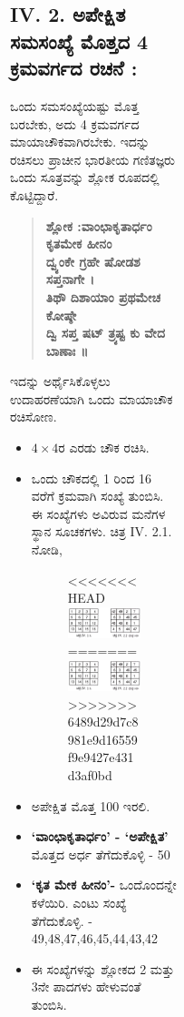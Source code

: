 \begin{figure}[H]
\begin{figure}[H]
\begin{figure}[h]
\begin{figure}[h]
\subsection*{IV. 2. ಅಪೇಕ್ಷಿತ ಸಮಸಂಖ್ಯೆ ಮೊತ್ತದ 4 ಕ್ರಮವರ್ಗದ ರಚನೆ :}

ಒಂದು ಸಮಸಂಖ್ಯೆಯಷ್ಟು ಮೊತ್ತ ಬರಬೇಕು, ಅದು 4 ಕ್ರಮವರ್ಗದ ಮಾಯಾಚೌಕವಾಗಿರಬೇಕು. ಇದನ್ನು ರಚಿಸಲು ಪ್ರಾಚೀನ ಭಾರತೀಯ ಗಣಿತಜ್ಞರು ಒಂದು ಸೂತ್ರವನ್ನು ಶ್ಲೋಕ ರೂಪದಲ್ಲಿ ಕೊಟ್ಟಿದ್ದಾರೆ.
\begin{quote}
\textbf{ಶ್ಲೋಕ :ವಾಂಛಾಕೃತಾರ್ಧಂ ಕೃತಮೇಕ ಹೀನಂ}\\
\textbf{ದ್ವ್ಯಂಕೇ ಗ್ರಹೇ ಷೋಡಶ ಸಪ್ತನಾಗೇ ।}\\
\textbf{ತಿಥೌ ದಿಶಾಯಾಂ ಪ್ರಥಮೇಚ ಕೋಷ್ಠೇ}\\
\textbf{ದ್ವಿ ಸಪ್ತ ಷಟ್ ತ್ರ್ಯಷ್ಟ ಕು ವೇದ ಬಾಣಾಃ ॥}
\end{quote}

ಇದನ್ನು ಅರ್ಥೈಸಿಕೊಳ್ಳಲು ಉದಾಹರಣೆಯಾಗಿ ಒಂದು ಮಾಯಾಚೌಕ ರಚಿಸೋಣ.
\begin{itemize}
	\item $4 \times 4$ರ ಎರಡು ಚೌಕ ರಚಿಸಿ.
	\item ಒಂದು ಚೌಕದಲ್ಲಿ 1 ರಿಂದ 16 ವರೆಗೆ ಕ್ರಮವಾಗಿ ಸಂಖ್ಯೆ ತುಂಬಿಸಿ. ಈ ಸಂಖ್ಯೆಗಳು ಅವಿರುವ ಮನೆಗಳ ಸ್ಥಾನ ಸೂಚಕಗಳು. ಚಿತ್ರ IV. 2.1. ನೋಡಿ,
	\begin{figure}[h]
<<<<<<< HEAD
	\includegraphics{src/figures/chap3/fig3-40.jpg}
=======
	\includegraphics[scale=.9]{src/figures/chap3/fig3.40.jpg}
>>>>>>> 6489d29d7c8981e9d16559f9e9427e431d3af0bd
	\end{figure}
	\item ಅಪೇಕ್ಷಿತ ಮೊತ್ತ 100 ಇರಲಿ.
	\item \textbf{‘ವಾಂಛಾಕೃತಾರ್ಧಂ’ - ‘ಅಪೇಕ್ಷಿತ’} ಮೊತ್ತದ ಅರ್ಧ ತೆಗೆದುಕೊಳ್ಳಿ - 50
	\item \textbf{‘ಕೃತ ಮೇಕ ಹೀನಂ’-} ಒಂದೊಂದನ್ನೇ ಕಳೆಯಿರಿ. ಎಂಟು ಸಂಖ್ಯೆ ತೆಗೆದುಕೊಳ್ಳಿ. - 49,48,47,46,45,44,43,42
	\item ಈ ಸಂಖ್ಯೆಗಳನ್ನು ಶ್ಲೋಕದ 2 ಮತ್ತು 3ನೇ ಪಾದಗಳು ಹೇಳುವಂತೆ ತುಂಬಿಸಿ.


\end{itemize}
\end{figure}
\end{figure}
\end{figure}
\end{figure}
